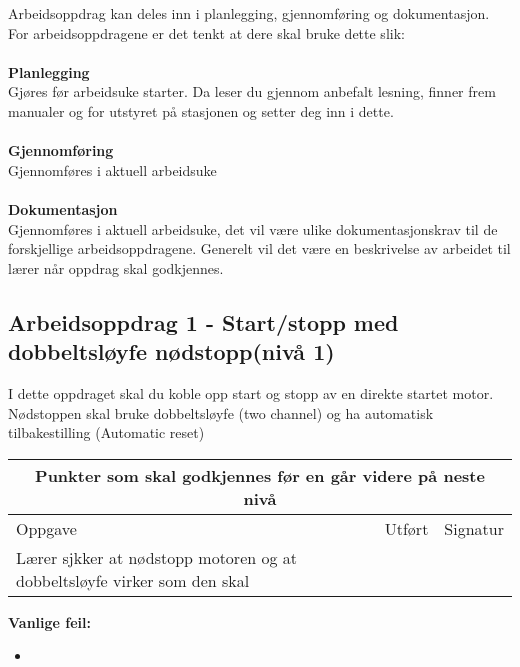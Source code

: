 Arbeidsoppdrag kan deles inn i planlegging, gjennomføring og dokumentasjon.\\
For arbeidsoppdragene er det tenkt at dere skal bruke dette slik:\\\\
\textbf{Planlegging}\\
Gjøres før arbeidsuke starter. Da leser du gjennom anbefalt lesning, finner frem manualer og for  utstyret på stasjonen og setter deg inn i dette.\\ \\
\textbf{Gjennomføring}\\
Gjennomføres i aktuell arbeidsuke\\\\

\textbf{Dokumentasjon}\\
Gjennomføres i aktuell arbeidsuke, det vil være ulike dokumentasjonskrav til de forskjellige arbeidsoppdragene. Generelt vil det være en beskrivelse av arbeidet til lærer når oppdrag skal godkjennes. \\


\newpage

\subsection*{Arbeidsoppdrag 1 -  Start/stopp med dobbeltsløyfe nødstopp(nivå 1)}
I dette oppdraget skal du koble opp start og stopp av en direkte startet motor. Nødstoppen skal bruke dobbeltsløyfe (two channel) og ha automatisk tilbakestilling (Automatic reset)
\begin{center} \begin{tabular}{ | m{8cm} | m{1cm}| m{2cm} | } 
\hline
\multicolumn{3}{|c|}{Punkter som skal godkjennes før en går videre på neste nivå} \\
	\hline
	Oppgave	& Utført & Signatur \\ 
	\hline
Lærer sjkker at nødstopp motoren og at dobbeltsløyfe virker som den skal& & \\ 
	\hline
\end{tabular}
\end{center}

\textbf{Vanlige feil:}
\begin{itemize}[noitemsep]
	\item 
\end{itemize}
\newpage

